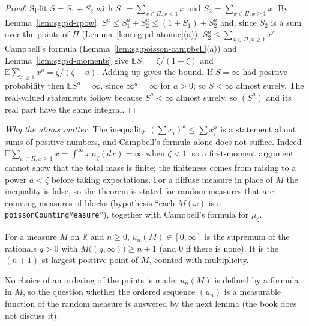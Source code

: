 \begin{proof}
  \leanok
{}
Split $S=S_1+S_2$ with $S_1=\sum_{x\in\Pi,x<1}x$ and $S_2=\sum_{x\in\Pi,x\ge1}x$. By Lemma~\ref{lem:sg:pd-rpow}, $S^a\le S_1^a+S_2^a\le(1+S_1)+S_2^a$ and, since $S_2$ is a sum over the points of $\Pi$ (Lemma~\ref{lem:sg:pd-atomic}(a)), $S_2^a\le\sum_{x\in\Pi,x\ge1}x^a$. Campbell's formula (Lemma~\ref{lem:sg:poisson-campbell}(a)) and Lemma~\ref{lem:sg:pd-moments} give $\mathbb ES_1=\zeta/(1-\zeta)$ and $\mathbb E\sum_{x\ge1}x^a=\zeta/(\zeta-a)$. Adding up gives the bound. If $S=\infty$ had positive probability then $\mathbb ES^a=\infty$, since $\infty^a=\infty$ for $a>0$; so $S<\infty$ almost surely. The real-valued statements follow because $S^a<\infty$ almost surely, so $(S^a)$ and its real part have the same integral.
\end{proof}

\emph{Why the atoms matter.} The inequality $(\sum x_i)^a\le\sum x_i^a$ is a statement about sums of positive numbers, and Campbell's formula alone does not suffice. Indeed $\mathbb E\sum_{x\in\Pi,x\ge1}x=\int_1^\infty x\,\mu_\zeta(dx)=\infty$ when $\zeta<1$, so a first-moment argument cannot show that the total mass is finite; the finiteness comes from raising to a power $a<\zeta$ before taking expectations. For a diffuse measure in place of $M$ the inequality is false, so the theorem is stated for random measures that are counting measures of blocks (hypothesis ``each $M(\omega)$ is a \texttt{poissonCountingMeasure}''), together with Campbell's formula for $\mu_\zeta$.

\begin{definition}\label{def:sg:pd-atoms}
  \leanok
For a measure $M$ on $\mathbb R$ and $n\ge0$, $u_n(M)\in[0,\infty]$ is the supremum of the rationals $q>0$ with $M\big((q,\infty)\big)\ge n+1$ (and $0$ if there is none). It is the $(n+1)$-st largest positive point of $M$, counted with multiplicity.
\end{definition}

No choice of an ordering of the points is made: $u_n(M)$ is defined by a formula in $M$, so the question whether the ordered sequence $(u_n)$ is a measurable function of the random measure is answered by the next lemma (the book does not discuss it).

